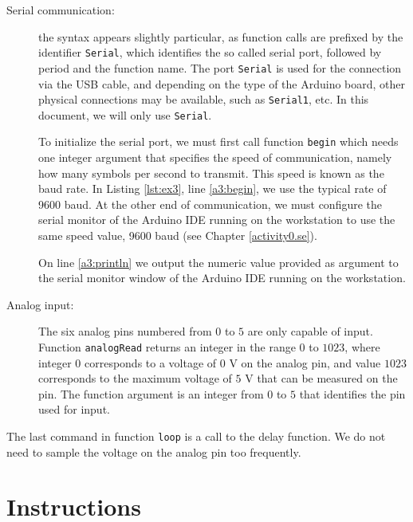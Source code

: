 \documentclass[12pt]{book}
\begin{document}
\begin{description}
\item[Serial communication:] the syntax appears slightly particular,
  as function calls are prefixed by the identifier
  \lstinline$Serial$, which identifies the so called serial port,
  followed by period and the function name. The port
  \lstinline$Serial$ is used for the connection via the USB cable, and
  depending on the type of the Arduino board, other physical connections may be
  available, such as \lstinline$Serial1$, etc. In this document, we will only use
  \lstinline$Serial$. 

  To initialize the serial port, we must first call function
  \lstinline$begin$ which needs one integer argument that specifies
  the speed of communication, namely how many symbols per second to
  transmit. This speed is known as the baud rate. In Listing
  \ref*{lst:ex3}, line \ref*{a3:begin}, we use the typical rate of
  9600 baud. At the other end of communication, we must configure the
  serial monitor of the Arduino IDE running on the workstation to use
  the same speed value, 9600 baud (see Chapter \ref{activity0.se}).

  On line \ref*{a3:println} we output the numeric value provided as
  argument to the serial monitor window of the Arduino IDE running on
  the workstation. 
\item[Analog input:] The six analog pins numbered from $0$ to $5$ are
  only capable of input. Function \lstinline$analogRead$ returns an
  integer in the range $0$ to $1023$, where integer $0$ corresponds to
  a voltage of $0$ V on the analog pin, and value $1023$ corresponds
  to the maximum voltage of $5$ V that can be measured on the pin. The
  function argument is an integer from $0$ to $5$ that identifies the
  pin used for input.
\end{description}

The last command in function \lstinline$loop$ is a call to the delay
function. We do not need to sample the voltage on the analog pin too
frequently. 




\section{Instructions}
\end{document}
